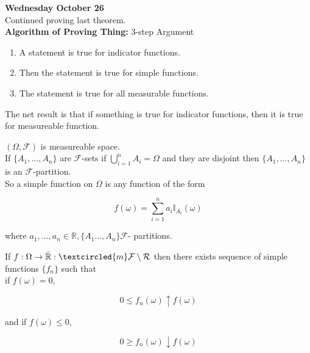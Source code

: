 \documentclass[11pt,fleqn]{book} %
\begin{document}
\textbf{Wednesday October 26}\\

	
Continued proving last theorem. \\

\textbf{Algorithm of Proving Thing:} 3-step Argument\\

\begin{enumerate}
	\item A statement is true for indicator functions.
	\item Then the statement is true for simple functions.
	\item The statement is true for all measurable functions. 
\end{enumerate}

The net result is that if something is true for indicator functions, then it is true for measureable function. \\


\begin{definition}
	$(\Omega, \mathcal{F})$ is measureable space. \\

	If $\{A_1, \dots, A_n\}$ are $\mathcal{F}$-sets if $\bigcup_{i=1}^n A_i = \Omega$ and they are disjoint then $\{A_1, \dots, A_n\}$ is an $\mathcal{F}$-partition. \\

	So a simple function on $\Omega$ is any function of the form

			$$ f(\omega) = \sum^n_{i=1} a_i \mathbb{I}_{A_i}(\omega) $$

	where $a_1, \dots, a_n \in \mathbb{R}, \{A_1 \dots, A_n \} \mathcal{F}$- partitions.
\end{definition}

\begin{theorem}
	If $f: \Omega\rightarrow \bar{\mathbb{R}}: \textcircled{m} \mathcal{F}\setminus \mathcal{R}$ then there exists sequence of simple functions $\{f_n\}$ such that\\

	if $f(\omega)= 0$, 

			$$ 0 \leq f_n(\omega) \uparrow f(\omega)$$

	and if $f(\omega) \leq 0$, 

			$$ 0 \geq f_n(\omega) \downarrow f(\omega)$$
\end{theorem}
\end{document}
